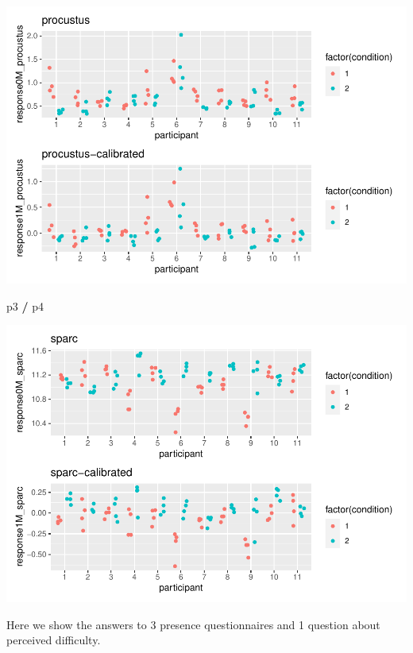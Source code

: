 \documentclass[
]{article}
\newenvironment{Shaded}{\begin{snugshade}}{\end{snugshade}}
\newcommand{\NormalTok}[1]{#1}
\newcommand{\SpecialCharTok}[1]{\textcolor[rgb]{0.81,0.36,0.00}{\textbf{#1}}}
\begin{document}
\includegraphics{08_Publish_GUSO_ASIL_files/figure-latex/showmetrics1-1.pdf}

\begin{Shaded}
\begin{Highlighting}[]
\NormalTok{p3 }\SpecialCharTok{/}\NormalTok{ p4}
\end{Highlighting}
\end{Shaded}

\includegraphics{08_Publish_GUSO_ASIL_files/figure-latex/showmetrics1-2.pdf}

Here we show the answers to 3 presence questionnaires and 1 question
about perceived difficulty.
\end{document}

